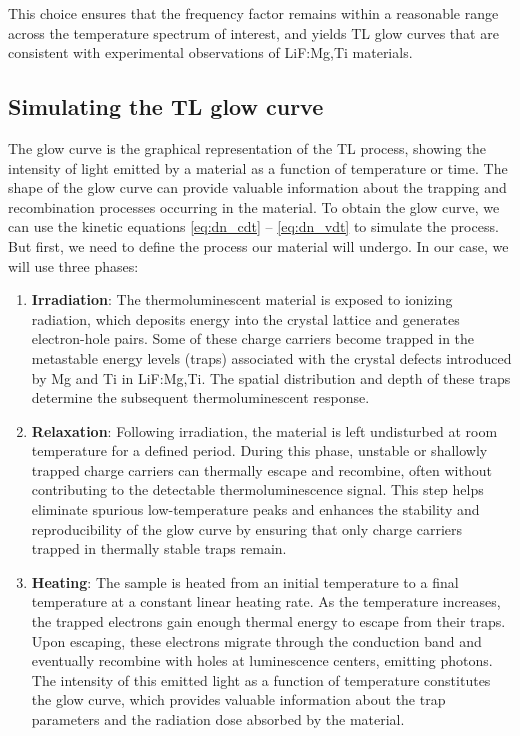 \vspace{10pt}

This choice ensures that the frequency factor remains within a reasonable range across the temperature spectrum of interest, and yields TL glow curves that are consistent with experimental observations of LiF:Mg,Ti materials.


\subsection{Simulating the TL glow curve} \label{sec:simulacioncurva}

The glow curve is the graphical representation of the TL process, showing the intensity of light emitted by a material as a function of temperature or time. The shape of the glow curve can provide valuable information about the trapping and recombination processes occurring in the material. To obtain the glow curve, we can use the kinetic equations \ref{eq:dn_cdt} -- \ref{eq:dn_vdt} to simulate the process. But first, we need to define the process our material will undergo. In our case, we will use three phases:

\begin{enumerate}
    \item \textbf{Irradiation}: The thermoluminescent material is exposed to ionizing radiation, which deposits energy into the crystal lattice and generates electron-hole pairs. Some of these charge carriers become trapped in the metastable energy levels (traps) associated with the crystal defects introduced by Mg and Ti in LiF:Mg,Ti. The spatial distribution and depth of these traps determine the subsequent thermoluminescent response.

    \item \textbf{Relaxation}: Following irradiation, the material is left undisturbed at room temperature for a defined period. During this phase, unstable or shallowly trapped charge carriers can thermally escape and recombine, often without contributing to the detectable thermoluminescence signal. This step helps eliminate spurious low-temperature peaks and enhances the stability and reproducibility of the glow curve by ensuring that only charge carriers trapped in thermally stable traps remain.

    \item \textbf{Heating}: The sample is heated from an initial temperature to a final temperature at a constant linear heating rate. As the temperature increases, the trapped electrons gain enough thermal energy to escape from their traps. Upon escaping, these electrons migrate through the conduction band and eventually recombine with holes at luminescence centers, emitting photons. The intensity of this emitted light as a function of temperature constitutes the glow curve, which provides valuable information about the trap parameters and the radiation dose absorbed by the material.
\end{enumerate}

